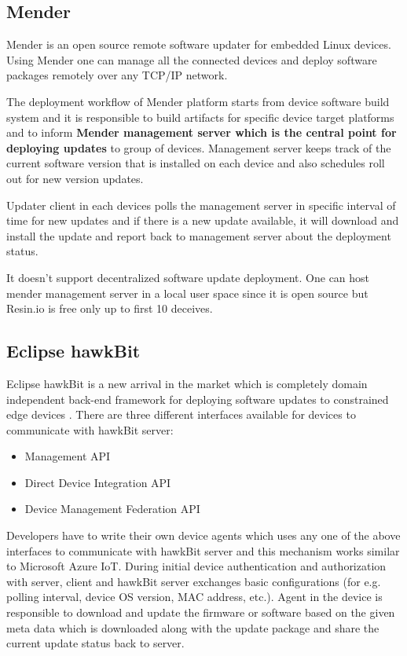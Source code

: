 \documentclass[12pt]{article}
\begin{document}
\subsection{Mender}
Mender is an open source remote software updater for embedded Linux devices. Using Mender one can manage all the connected devices and deploy software packages remotely over any TCP/IP network.

\noindent The deployment workflow of Mender platform starts from device software build system and it is responsible to build artifacts for specific device target platforms and to inform \textbf{Mender management server which is the central point for deploying updates} \cite{misc09} to group of devices. Management server keeps track of the current software version that is installed on each device and also schedules roll out for new version updates. 

Updater client in each devices polls the management server in specific interval of time for new updates and if there is a new update available, it will download and install the update and report back to management server about the deployment status.

It doesn't support decentralized software update deployment. One can host mender management server in a local user space since it is open source but Resin.io is free only up to first 10 deceives. 

\subsection{Eclipse hawkBit}

Eclipse hawkBit is a new arrival in the market which is completely domain independent back-end framework for deploying software updates to constrained edge devices \cite{misc10}. There are three different interfaces available for devices to communicate with hawkBit server:

\begin{itemize}
	\item Management API
	\item Direct Device Integration API
	\item Device Management Federation API
\end{itemize}

Developers have to write their own device agents which uses any one of the above interfaces to communicate with hawkBit server and this mechanism works similar to Microsoft Azure IoT. During initial device authentication and authorization with server, client and hawkBit server exchanges basic configurations (for e.g. polling interval, device OS version, MAC address, etc.). Agent in the device is responsible to download and update the firmware or software based on the given meta data which is downloaded along with the update package and share the current update status back to server.
\end{document}
